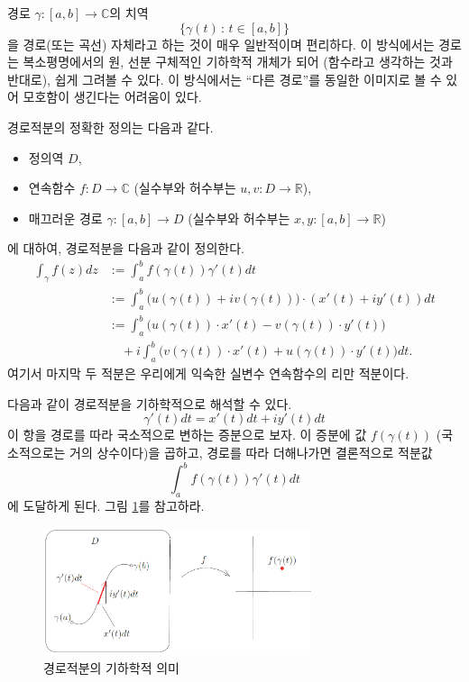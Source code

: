 \begin{salt_remark} \label{remark-3-1}
경로 $\gamma: [a,b]\to \mathbb C$의 치역
\[
\{\gamma(t) \,:\, t\in[a,b] \}
\]
을 경로(또는 곡선) 자체라고 하는 것이 매우 일반적이며 편리하다. 
이 방식에서는 경로는 
복소평명에서의 원, 선분 구체적인 기하학적 개체가 되어 (함수라고 생각하는 것과 반대로),
쉽게 그려볼 수 있다.
이 방식에서는 ``다른 경로''를 동일한 이미지로 볼 수 있어
모호함이 생긴다는 어려움이 있다.
\end{salt_remark}

경로적분의 정확한 정의는 다음과 같다.

\newpage %

\begin{saltdefinition} {}{} \label{def-3-1}
\begin{itemize}
\item[(1)] 정의역 $D$,
\item[(2)] 연속함수  $f:D\to\mathbb C$ (실수부와 허수부는 
$u,v: D\to\mathbb R$),
\item[(3)] 매끄러운 경로 $\gamma : [a,b]\to D$
(실수부와 허수부는 $x,y: [a,b] \to \mathbb R$)
\end{itemize}
에 대하여,
경로적분을 다음과 같이 정의한다.
\begin{align} \label{eq-3-2}
\int_\gamma f(z)dz
&:= \int_a^b f(\gamma(t))\gamma'(t)dt \\
&:= \int_a^b \big( u(\gamma(t)) + iv(\gamma(t)) \big) \cdot
(x'(t) + iy'(t))dt \nonumber \\
&:= \int_a^b \big( u(\gamma(t))\cdot x'(t) - v(\gamma(t))\cdot y'(t) \big) \nonumber \\
&\quad +i \int_a^b \big(v(\gamma(t))\cdot x'(t) + u(\gamma(t))\cdot y'(t) \big) dt \nonumber.
\end{align}
여기서 마지막 두 적분은 우리에게 익숙한 실변수 연속함수의 리만 적분이다.
\end{saltdefinition}

다음과 같이 경로적분을 기하학적으로 해석할 수 있다.
\[
\gamma'(t) dt = x'(t)dt + iy'(t)dt
\]
이 항을 경로를 따라 국소적으로 변하는 증분으로 보자.
이 증분에 값 $f(\gamma(t))$ (국소적으로는 거의 상수이다)을 곱하고,
경로를 따라 더해나가면 결론적으로 적분값
\[
\int_a^b f(\gamma(t))\gamma'(t)dt
\]
에 도달하게 된다. 그림 \ref{fig-3-4}를 참고하라.

\begin{figure}[!h]
\begin{center}
\includegraphics[width=0.7\textwidth]{./SaltChapter/figs/fig-3-4}
\end{center}
\caption{경로적분의 기하학적 의미}
\label{fig-3-4}
\end{figure}

